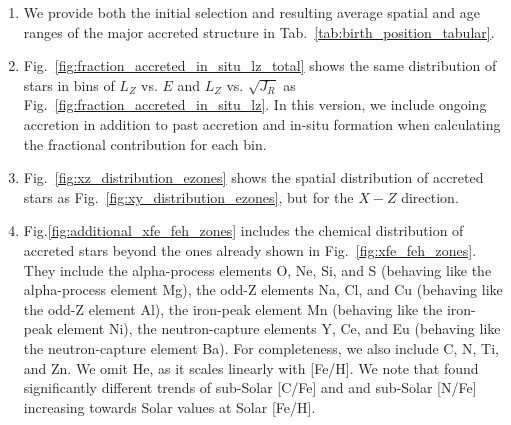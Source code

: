 \documentclass[fleqn,usenatbib]{mnras}
\newcommand{\changed}[1]{{{#1}}}
\begin{document}
\begin{enumerate}[leftmargin=2em,labelwidth=0em]
    \item We provide both the initial selection and resulting average spatial and age ranges of the major accreted structure in Tab.~\ref{tab:birth_position_tabular}.
    \item Fig.~\ref{fig:fraction_accreted_in_situ_lz_total} shows the same distribution of stars in bins of $L_Z$ vs. $E$ and $L_Z$ vs. $\sqrt{J_R}$ as Fig.~\ref{fig:fraction_accreted_in_situ_lz}. In this version, we include ongoing accretion in addition to past accretion and in-situ formation when calculating the fractional contribution for each bin. 
    \item Fig.~\ref{fig:xz_distribution_ezones} shows the spatial distribution of accreted stars as Fig.~\ref{fig:xy_distribution_ezones}, but for the $X-Z$ direction.
    \item Fig.\ref{fig:additional_xfe_feh_zones} includes the chemical distribution of accreted stars beyond the ones already shown in Fig.~\ref{fig:xfe_feh_zones}. They include the alpha-process elements O, Ne, Si, and S (behaving like the alpha-process element Mg), the odd-Z elements Na, Cl, and Cu (behaving like the odd-Z element Al), the iron-peak element Mn (behaving like the iron-peak element Ni), the neutron-capture elements Y, Ce, and Eu (behaving like the neutron-capture element Ba). For completeness, we also include C, N, Ti, and Zn. We omit He, as it scales linearly with [Fe/H]. \changed{We note that \citet[][see their Fig.~15]{Khoperskov2023c} found significantly different trends of sub-Solar [C/Fe] and and sub-Solar [N/Fe] increasing towards Solar values at Solar [Fe/H].}
\end{enumerate}

\label{lastpage}
\end{document}
